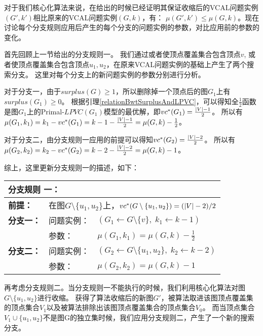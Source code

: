 对于我们核心化算法来说，在给出的时候已经证明其保证收缩后的VCAL问题实例$(G', k')$相比原来的VCAL问题实例$(G, k)$，有：
$\mu(G', k') \le \mu(G,  k)$。现在讨论每个分支规则应用后产生的每个分支的问题实例的参数，对比应用前的参数的变化。

\vspace{0.5cm}

首先回顾上一节给出的分支规则一。
我们通过或者使顶点覆盖集合包含顶点$v$, 或者使顶点覆盖集合包含顶点$u_1, u_2$，在原来VCAL问题实例的基础上产生了两个搜索分支。
这里对每个分支上的新问题实例的参数分别进行分析。

对于分支一，由于$surplus(G) \ge 1$，所以删除掉一个顶点后的图$G_1$上有$surplus(G_1) \ge 0$。
根据引理\ref{relationBwtSurplusAndLPVC}，可以得知全$\frac{1}{2}$函数是图$G_1$上的Primal-$LPVC(G_1)$模型的最优解，即$vc^*(G_1) = \frac{\left\vert V \right\vert - 1}{2}$。
所以有$\mu(G_1, k_1) = k_1 - vc^*(G_1) = k - 1 - \frac{\left\vert V \right\vert - 1}{2} = \mu(G, k) - \frac{1}{2}$。

对于分支二，由分支规则一应用的前提可以得知$vc^*(G_2) = \frac{\left\vert V \right\vert - 2}{2}$。
所以有$\mu(G_2, k_2) = k_2 - vc^*(G_2) = k - 2 - \frac{\left\vert V \right\vert - 2}{2} = \mu(G, k) - 1$。

综上，这里更新分支规则一的描述，如下：\\

\begin{tabular}{ p{0.12\headwidth} | p{0.12\headwidth}p{0.66\headwidth} }
  \multicolumn{3}{l}{ \textbf{分支规则 一：} }\\
  \hline
  \textbf{前提：}  & \multicolumn{2}{l}{在图$G \setminus \{u_1, u_2\}$上，$vc^*(G \setminus \{u_1, u_2\}) = (\left\vert V \right\vert - 2) / 2$}\\
  \hline
  \textbf{分支一：} & 问题实例：&$(G_1 \leftarrow G \setminus \{v\},\; k_1 \leftarrow k - 1)$ \\
                    & 参数：&$\mu(G_1, k_1) = \mu(G, k) - \frac{1}{2}$\\
  \hline
  \textbf{分支二：} & 问题实例：&$(G_2 \leftarrow G \setminus \{u_1, u_2\},\; k_2 \leftarrow k - 2)$\\
                    & 参数：&$\mu(G_2, k_2) = \mu(G, k) - 1$\\
  \hline
\end{tabular} \vspace{0.5cm}  

\vspace{0.5cm}
再考虑分支规则二。当分支规则一不能执行的时候，我们利用核心化算法对图$G \setminus \{u_1, u_2\}$进行收缩。
获得了算法收缩后的新图$G'$，被算法取进该图顶点覆盖集的顶点集合$V_1$以及被算法排除出该图顶点覆盖集合的顶点集合$V_0$。
而当顶点集合$V_1 \cup \{u_1, u_2\}$不是图G的独立集时候，我们应用分支规则二，产生了一个新的搜索分支。

